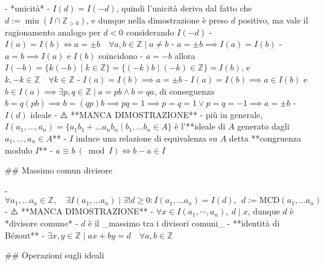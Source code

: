   - *unicità*
    - \( I(d)=I(-d)\), quindi l'unicità deriva dal fatto che $d:=\min(I \cap \mathbb{Z}_{\gt 0})$, e dunque nella dimostrazione è preso $d$ positivo, ma vale il ragionamento analogo per $d < 0$ considerando $I(-d)$
      - \( I(a)=I(b) \iff a=\pm b \quad \forall a, b \in \mathbb{Z} \mid a \neq b\)
        - \( a=\pm b \implies I(a)=I(b) \)
          - $a = b \implies I(a)$ e $I(b)$ coincidono
          - $a = -b$ allora $I(-b) = \{ k(-b) \mid k \in \mathbb{Z}\} = \{(-k)b \mid (-k) \in \mathbb{Z}\} = I(b)$, e $k, -k \in \mathbb{Z} \quad \forall k \in \mathbb{Z}$
        - $I(a) = I(b) \implies a = \pm b$
          - $I(a) = I(b) \implies a \in I(b)$ e $b \in I(a) \implies \exists p, q \in \mathbb{Z} \mid a = pb \wedge b = qa$, di conseguenza $b = q (pb) \implies b = (qp)b \implies pq = 1 \implies p = q = 1 \lor p = q = -1 \implies a = \pm b$
  - $I(d)$ ideale
    - ⚠️ **MANCA DIMOSTRAZIONE**
    - più in generale, $I(a_1, \ldots, a_n) = \{ a_1b_1 + \ldots a_nb_n \mid b_1, \ldots b_n \in A\}$ è l'**ideale di $A$ generato dagli $a_1, \ldots, a_n \in A$**
      - $I$ induce una relazione di equivalenza su $A$ detta **congruenza modulo $I$**
        - $a \equiv b \ (\bmod I) \iff b - a \in I$

## Massimo comun divisore

- \( \forall a_{1}, \ldots a_{n} \in \mathbb{Z}, \quad \exists I\left(a_{1}, \ldots a_{n}\right) \mid \exists ! d \geq 0  : I\left(a_{1}, \ldots a_{n}\right)=I(d),   \ \ d:=\textrm{MCD}(a_{1}, \ldots a_{n}) \)
    - ⚠️ **MANCA DIMOSTRAZIONE**
        - $\forall x \in I(a_1, \cdots, a_n), \ d \mid x$, dunque $d$ è *divisore comune*
        - $d$ è il _massimo tra i divisori comuni_
  - **identità di Bézout**
    - \( \exists x, y \in \mathbb{Z} \mid a x+b y=d \quad \forall a, b \in \mathbb{Z} \)
 
## Operazioni sugli ideali

